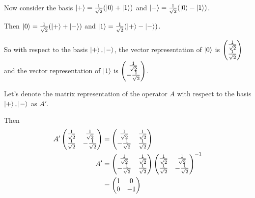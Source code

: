 \documentclass[12pt]{extarticle}
\begin{document}
\hhline

Now consider the basis $\ket{+} = \frac{1}{\sqrt{2}}(\ket{0} + \ket{1})$ and $\ket{-} = \frac{1}{\sqrt{2}}(\ket{0} - \ket{1})$.

Then $\ket{0} = \frac{1}{\sqrt{2}}(\ket{+} + \ket{-})$ and $\ket{1} = \frac{1}{\sqrt{2}}(\ket{+} - \ket{-})$.

So with respect to the basis $\ket{+}, \ket{-}$, the vector representation of $\ket{0}$ is
$\begin{pmatrix} \frac{1}{\sqrt{2}} \\ \frac{1}{\sqrt{2}} \end{pmatrix}$ and the vector representation of $\ket{1}$ is $\begin{pmatrix} \frac{1}{\sqrt{2}} \\ -\frac{1}{\sqrt{2}} \end{pmatrix}$.

Let's denote the matrix representation of the operator $A$ with respect to the basis $\ket{+}, \ket{-}$ as $A'$.

Then
\begin{align*}
A'\begin{pmatrix}\frac{1}{\sqrt{2}} & \frac{1}{\sqrt{2}} \\ \frac{1}{\sqrt{2}} & -\frac{1}{\sqrt{2}}\end{pmatrix} & = \begin{pmatrix} \frac{1}{\sqrt{2}} & \frac{1}{\sqrt{2}} \\ -\frac{1}{\sqrt{2}} & \frac{1}{\sqrt{2}} \end{pmatrix} \\
A' & = \begin{pmatrix} \frac{1}{\sqrt{2}} & \frac{1}{\sqrt{2}} \\ -\frac{1}{\sqrt{2}} & \frac{1}{\sqrt{2}}\end{pmatrix} {{\begin{pmatrix}\frac{1}{\sqrt{2}}& \frac{1}{\sqrt{2}}\\ \frac{1}{\sqrt{2}}& -\frac{1}{\sqrt{2}}\end{pmatrix}}^{-1}} \\
& = \begin{pmatrix} 1 & 0 \\ 0 & -1 \end{pmatrix}
\end{align*}


\end{document}
